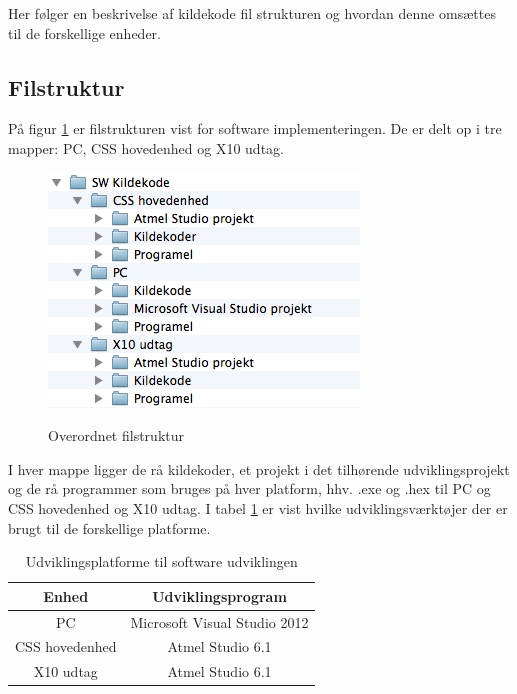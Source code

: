 Her følger en beskrivelse af kildekode fil strukturen og hvordan denne omsættes til de forskellige enheder.

\subsection{Filstruktur}
På figur \ref{fig:filstruktur1} er filstrukturen vist for software implementeringen.
De er delt op i tre mapper: PC, CSS hovedenhed og X10 udtag.

\begin{figure}[!htb]
     {\includegraphics[width=\textwidth]{billeder/Filstruktur1}}
     \caption{Overordnet filstruktur}
     \label{fig:filstruktur1}
\end{figure}

I hver mappe ligger de rå kildekoder, et projekt i det tilhørende udviklingsprojekt og de rå programmer som bruges på hver platform, hhv. .exe og .hex til PC og CSS hovedenhed og X10 udtag.
I tabel \ref{table:Udviklingsprogrammer} er vist hvilke udviklingsværktøjer der er brugt til de forskellige platforme.

\begin{table}[htb]
	\caption{Udviklingsplatforme til software udviklingen}
	\centering
	\begin{tabular}{|c|c|}
		\hline 
		\textbf{Enhed} & \textbf{Udviklingsprogram} \\ 
		\hline 
		PC & Microsoft Visual Studio 2012 \\ 
		\hline 
		CSS hovedenhed & Atmel Studio 6.1 \\ 
		\hline 
		X10 udtag & Atmel Studio 6.1 \\ 
		\hline 
	\end{tabular} 
	\label{table:Udviklingsprogrammer}
\end{table}
